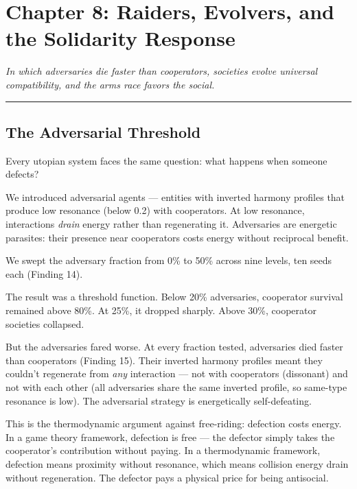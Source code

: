 \chapter{Chapter 8: Raiders, Evolvers, and the Solidarity Response}\label{chapter-8-raiders-evolvers-and-the-solidarity-response}

\emph{In which adversaries die faster than cooperators, societies evolve universal compatibility, and the arms race favors the social.}

\begin{center}\rule{0.5\linewidth}{0.5pt}\end{center}

\section{The Adversarial Threshold}\label{the-adversarial-threshold}

Every utopian system faces the same question: what happens when someone defects?

We introduced adversarial agents --- entities with inverted harmony profiles that produce low resonance (below 0.2) with cooperators. At low resonance, interactions \emph{drain} energy rather than regenerating it. Adversaries are energetic parasites: their presence near cooperators costs energy without reciprocal benefit.

We swept the adversary fraction from 0\% to 50\% across nine levels, ten seeds each (Finding 14).

The result was a threshold function. Below 20\% adversaries, cooperator survival remained above 80\%. At 25\%, it dropped sharply. Above 30\%, cooperator societies collapsed.

But the adversaries fared worse. At every fraction tested, adversaries died faster than cooperators (Finding 15). Their inverted harmony profiles meant they couldn't regenerate from \emph{any} interaction --- not with cooperators (dissonant) and not with each other (all adversaries share the same inverted profile, so same-type resonance is low). The adversarial strategy is energetically self-defeating.

This is the thermodynamic argument against free-riding: defection costs energy. In a game theory framework, defection is free --- the defector simply takes the cooperator's contribution without paying. In a thermodynamic framework, defection means proximity without resonance, which means collision energy drain without regeneration. The defector pays a physical price for being antisocial.

